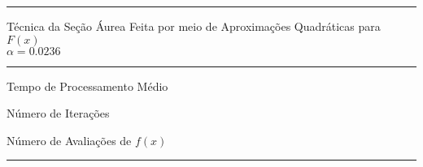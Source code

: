         \begin{minipage}[h!]{\linewidth}
            \centering
            \hrule
            \vspace{2mm}
            Técnica da Seção Áurea Feita por meio de Aproximações Quadráticas para $F(x)$ \\ $\alpha=0.0236$
            \vspace{2mm}
            \noindent
            \hrule 
            \vspace{2mm}
            Tempo de Processamento Médio\\
            \label{tab:tblDa} 
            \writetablestt{\tblDa}\par
            \bigskip
            \centering
            Número de Iterações\\
            \label{tab:tblDb} 
            \writetablestt{\tblDb}\par
            \bigskip
            \centering
            Número de Avaliações de $f(x)$\\
            \label{tab:tblDc} 
            \writetablestt{\tblDc}\par
            \vspace{2mm}
            \hrule
            \vspace{2mm}
        \end{minipage}

\newpage